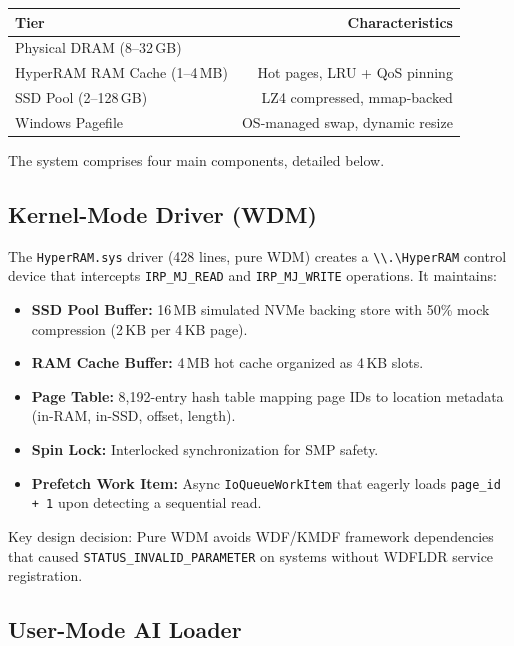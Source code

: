 \documentclass[11pt,a4paper]{article}
\newcommand{\code}[1]{\texttt{#1}}
\begin{document}
\begin{center}
\begin{tabular}{lr}
\toprule
\textbf{Tier} & \textbf{Characteristics} \\
\midrule
Physical DRAM (8--32\,GB) & \\
\quad HyperRAM RAM Cache (1--4\,MB) & Hot pages, LRU + QoS pinning \\
SSD Pool (2--128\,GB) & LZ4 compressed, mmap-backed \\
Windows Pagefile & OS-managed swap, dynamic resize \\
\bottomrule
\end{tabular}
\end{center}

The system comprises four main components, detailed below.

\subsection{Kernel-Mode Driver (WDM)}
\label{sec:driver}

The \code{HyperRAM.sys} driver (428 lines, pure WDM) creates a \code{\textbackslash\textbackslash .\textbackslash HyperRAM} control device that intercepts \code{IRP\_MJ\_READ} and \code{IRP\_MJ\_WRITE} operations. It maintains:

\begin{itemize}
    \item \textbf{SSD Pool Buffer:} 16\,MB simulated NVMe backing store with 50\% mock compression (2\,KB per 4\,KB page).
    \item \textbf{RAM Cache Buffer:} 4\,MB hot cache organized as 4\,KB slots.
    \item \textbf{Page Table:} 8{,}192-entry hash table mapping page IDs to location metadata (in-RAM, in-SSD, offset, length).
    \item \textbf{Spin Lock:} Interlocked synchronization for SMP safety.
    \item \textbf{Prefetch Work Item:} Async \code{IoQueueWorkItem} that eagerly loads \code{page\_id + 1} upon detecting a sequential read.
\end{itemize}

Key design decision: Pure WDM avoids WDF/KMDF framework dependencies that caused \code{STATUS\_INVALID\_PARAMETER} on systems without WDFLDR service registration.

\subsection{User-Mode AI Loader}
\end{document}

